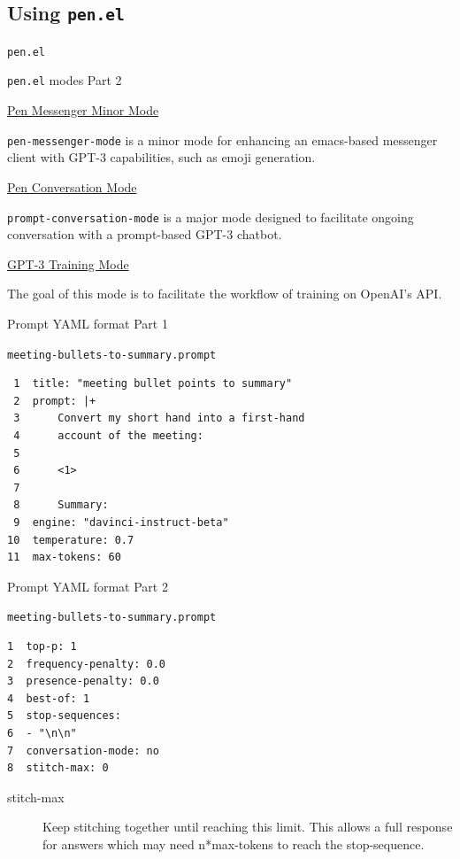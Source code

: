 \documentclass[presentation]{beamer}
\begin{document}
\subsection{Using \texttt{pen.el}}
\label{sec:org43c4ab3}
\begin{frame}[label={sec:org3964a4f},fragile]{\texttt{pen.el}}
 \begin{block}{\texttt{pen.el} modes Part 2}
{\footnotesize
\uline{\alert{Pen Messenger Minor Mode}}

\texttt{pen-messenger-mode} is a minor mode for
enhancing an emacs-based messenger client with
GPT-3 capabilities, such as emoji generation.

\uline{\alert{Pen Conversation Mode}}

\texttt{prompt-conversation-mode} is a major mode designed to facilitate
ongoing conversation with a prompt-based GPT-3 chatbot.

\uline{\alert{GPT-3 Training Mode}}

The goal of this mode is to facilitate the
workflow of training on OpenAI's API.
}
\end{block}
\end{frame}

\begin{frame}[label={sec:orgdabdca0},fragile]{Prompt YAML format Part 1}
 \begin{block}{\texttt{meeting-bullets-to-summary.prompt}}
\begin{verbatim}
 1  title: "meeting bullet points to summary"
 2  prompt: |+
 3      Convert my short hand into a first-hand
 4      account of the meeting:
 5  
 6      <1>
 7  
 8      Summary:
 9  engine: "davinci-instruct-beta"
10  temperature: 0.7
11  max-tokens: 60
\end{verbatim}
\end{block}
\end{frame}

\begin{frame}[label={sec:org5239f78},fragile]{Prompt YAML format Part 2}
 \begin{block}{\texttt{meeting-bullets-to-summary.prompt}}
\begin{verbatim}
1  top-p: 1
2  frequency-penalty: 0.0
3  presence-penalty: 0.0
4  best-of: 1
5  stop-sequences:
6  - "\n\n"
7  conversation-mode: no
8  stitch-max: 0
\end{verbatim}

\begin{description}
\item[{stitch-max}] Keep stitching together until reaching this limit.
This allows a full response for answers which may need n*max-tokens to reach the stop-sequence.
\end{description}
\end{block}
\end{frame}
\end{document}
